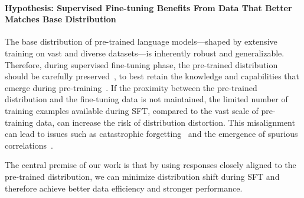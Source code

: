 \paragraph{Hypothesis: Supervised Fine-tuning Benefits From Data That Better Matches Base Distribution}

The base distribution of pre-trained language models—shaped by extensive training on vast and diverse datasets—is inherently robust and generalizable. Therefore, during supervised fine-tuning phase, the pre-trained distribution should be carefully preserved~\cite{kumar2022finetuningdistortpretrainedfeatures,cohenwang2024askdistributionshiftpretraining,he2023preservingpretrained,yang2024selfdistillationbridgesdistributiongap,ding2023peft}, to best retain the knowledge and capabilities that emerge during pre-training~\cite{zhou2023lima}. 
If the proximity between the pre-trained distribution and the fine-tuning data is not maintained, the limited number of training examples available during SFT, compared to the vast scale of pre-training data, can increase the risk of distribution distortion. This misalignment can lead to issues such as catastrophic forgetting~\cite{aghajanyan2020betterfinetuningreducingrepresentational,yang2024selfdistillationbridgesdistributiongap} and the emergence of spurious correlations~\cite{feldman2021doeslearningrequirememorization}.

The central premise of our work is that by using responses closely aligned to the pre-trained distribution, we can minimize distribution shift during SFT and therefore achieve better data efficiency and stronger performance. 



